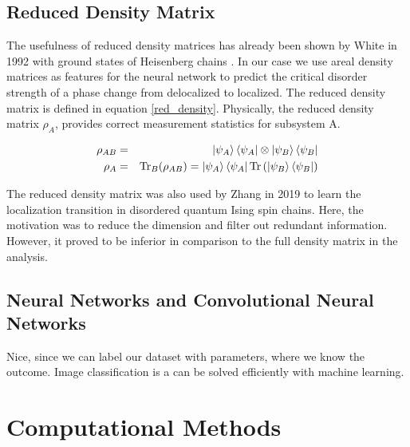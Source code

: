 \documentclass[reprint,amsmath,amssymb,aps,prb]{revtex4-2}
\begin{document}
\subsection{Reduced Density Matrix}

The usefulness of reduced density matrices has already been shown by White in 1992 with ground states of Heisenberg chains \cite{White1992}. In our case we use areal density matrices as features for the neural network to predict the critical disorder strength of a phase change from delocalized to localized. The reduced density matrix is defined in equation \ref{red_density}. Physically, the reduced density matrix $\rho_A$, provides correct measurement statistics for subsystem A.

\begin{eqnarray}
\rho_{AB}&=&\ket{\psi_A}\bra{\psi_A}\otimes\ket{\psi_B}\bra{\psi_B}\\
\rho_A&=&\text{Tr}_B(\rho_{AB})=\ket{\psi_A}\bra{\psi_A}\text{Tr}\left(\ket{\psi_B}\bra{\psi_B}\right)\label{red_density}
\end{eqnarray}%

The reduced density matrix was also used by Zhang in 2019 to learn the localization transition in disordered quantum Ising spin chains. Here, the motivation was to reduce the dimension and filter out redundant information. However, it proved to be inferior in comparison to the full density matrix in the analysis. \cite{Zhang2019}


\subsection{Neural Networks and Convolutional Neural Networks}


Nice, since we can label our dataset with parameters, where we know the outcome.
Image classification is a can be solved efficiently with machine learning.%


\section{Computational Methods}
\end{document}
